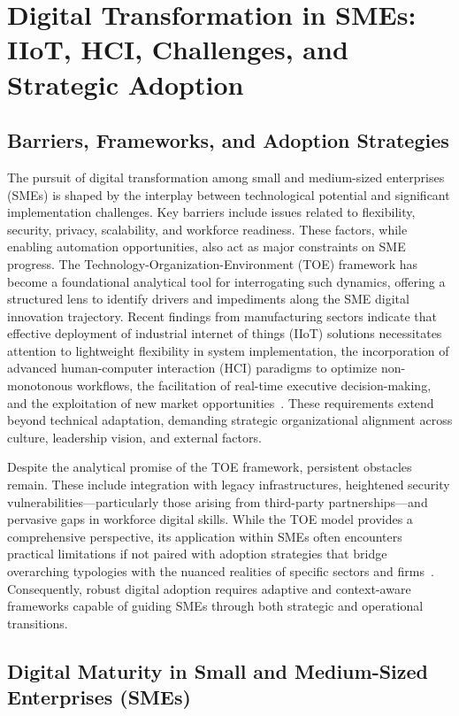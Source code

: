 \documentclass[11pt]{article}
\begin{document}
\section{Digital Transformation in SMEs: IIoT, HCI, Challenges, and Strategic Adoption}

\subsection{Barriers, Frameworks, and Adoption Strategies}

The pursuit of digital transformation among small and medium-sized enterprises (SMEs) is shaped by the interplay between technological potential and significant implementation challenges. Key barriers include issues related to flexibility, security, privacy, scalability, and workforce readiness. These factors, while enabling automation opportunities, also act as major constraints on SME progress. The Technology-Organization-Environment (TOE) framework has become a foundational analytical tool for interrogating such dynamics, offering a structured lens to identify drivers and impediments along the SME digital innovation trajectory. Recent findings from manufacturing sectors indicate that effective deployment of industrial internet of things (IIoT) solutions necessitates attention to lightweight flexibility in system implementation, the incorporation of advanced human-computer interaction (HCI) paradigms to optimize non-monotonous workflows, the facilitation of real-time executive decision-making, and the exploitation of new market opportunities~\cite{ref89}. These requirements extend beyond technical adaptation, demanding strategic organizational alignment across culture, leadership vision, and external factors.

Despite the analytical promise of the TOE framework, persistent obstacles remain. These include integration with legacy infrastructures, heightened security vulnerabilities—particularly those arising from third-party partnerships—and pervasive gaps in workforce digital skills. While the TOE model provides a comprehensive perspective, its application within SMEs often encounters practical limitations if not paired with adoption strategies that bridge overarching typologies with the nuanced realities of specific sectors and firms~\cite{ref89}. Consequently, robust digital adoption requires adaptive and context-aware frameworks capable of guiding SMEs through both strategic and operational transitions.

\subsection{Digital Maturity in Small and Medium-Sized Enterprises (SMEs)}
\end{document}
